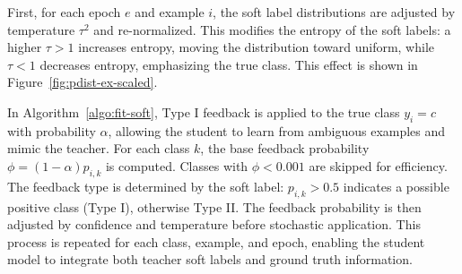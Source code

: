 \documentclass[sn-mathphys-num]{sn-jnl}%
\theoremstyle{thmstyleone}%
\theoremstyle{thmstyletwo}%
\theoremstyle{thmstylethree}%
\begin{document}
First, for each epoch $e$ and example $i$, the soft label distributions are adjusted by temperature $\tau^2$ and re-normalized. This modifies the entropy of the soft labels: a higher $\tau>1$ increases entropy, moving the distribution toward uniform, while $\tau<1$ decreases entropy, emphasizing the true class. This effect is shown in Figure~\ref{fig:pdist-ex-scaled}. 

In Algorithm~\ref{algo:fit-soft}, Type I feedback is applied to the true class $y_i=c$ with probability $\alpha$, allowing the student to learn from ambiguous examples and mimic the teacher. For each class $k$, the base feedback probability $\phi = (1-\alpha) p_{i,k}$ is computed. Classes with $\phi < 0.001$ are skipped for efficiency. The feedback type is determined by the soft label: $p_{i,k} > 0.5$ indicates a possible positive class (Type I), otherwise Type II. The feedback probability is then adjusted by confidence and temperature before stochastic application. This process is repeated for each class, example, and epoch, enabling the student model to integrate both teacher soft labels and ground truth information.
\end{document}
